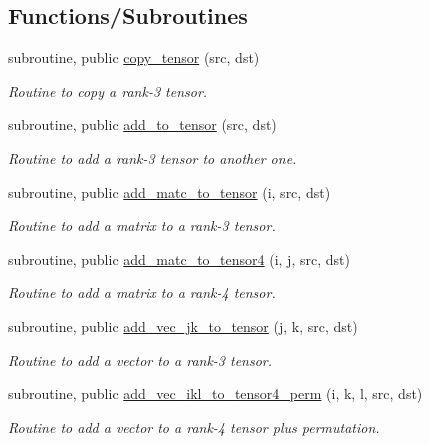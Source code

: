 \subsection*{Functions/\+Subroutines}
\begin{DoxyCompactItemize}
\item 
subroutine, public \hyperlink{namespacetensor_a4a88ee8077278486c5128ad97617969e}{copy\+\_\+tensor} (src, dst)
\begin{DoxyCompactList}\small\item\em Routine to copy a rank-\/3 tensor. \end{DoxyCompactList}\item 
subroutine, public \hyperlink{namespacetensor_aad7cd55f3a4cec4676cc7ca34b05f1a8}{add\+\_\+to\+\_\+tensor} (src, dst)
\begin{DoxyCompactList}\small\item\em Routine to add a rank-\/3 tensor to another one. \end{DoxyCompactList}\item 
subroutine, public \hyperlink{namespacetensor_a4c63a1dd16bf751220f016b41bdaa78c}{add\+\_\+matc\+\_\+to\+\_\+tensor} (i, src, dst)
\begin{DoxyCompactList}\small\item\em Routine to add a matrix to a rank-\/3 tensor. \end{DoxyCompactList}\item 
subroutine, public \hyperlink{namespacetensor_ab32e3f9d0aab15d2fa34dc3e509ee8bf}{add\+\_\+matc\+\_\+to\+\_\+tensor4} (i, j, src, dst)
\begin{DoxyCompactList}\small\item\em Routine to add a matrix to a rank-\/4 tensor. \end{DoxyCompactList}\item 
subroutine, public \hyperlink{namespacetensor_aaa98410f224bc3dfb96cd7031f56e916}{add\+\_\+vec\+\_\+jk\+\_\+to\+\_\+tensor} (j, k, src, dst)
\begin{DoxyCompactList}\small\item\em Routine to add a vector to a rank-\/3 tensor. \end{DoxyCompactList}\item 
subroutine, public \hyperlink{namespacetensor_a9e443c5b0f095efdbb0df2e876b760be}{add\+\_\+vec\+\_\+ikl\+\_\+to\+\_\+tensor4\+\_\+perm} (i, k, l, src, dst)
\begin{DoxyCompactList}\small\item\em Routine to add a vector to a rank-\/4 tensor plus permutation. \end{DoxyCompactList}\item 

\end{DoxyCompactItemize}
